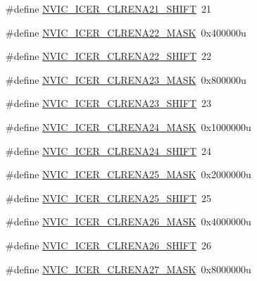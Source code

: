 \begin{DoxyCompactItemize}
\item 
\#define \hyperlink{group___n_v_i_c___register___masks_gaa517bbb381d2d5496341099c0bb969f1}{N\+V\+I\+C\+\_\+\+I\+C\+E\+R\+\_\+\+C\+L\+R\+E\+N\+A21\+\_\+\+S\+H\+I\+FT}~21
\item 
\#define \hyperlink{group___n_v_i_c___register___masks_gab16a0c722d3f0faf59b0bba1716439b3}{N\+V\+I\+C\+\_\+\+I\+C\+E\+R\+\_\+\+C\+L\+R\+E\+N\+A22\+\_\+\+M\+A\+SK}~0x400000u
\item 
\#define \hyperlink{group___n_v_i_c___register___masks_ga76e6fc6d65c0ad29a5c9a55e94af68bb}{N\+V\+I\+C\+\_\+\+I\+C\+E\+R\+\_\+\+C\+L\+R\+E\+N\+A22\+\_\+\+S\+H\+I\+FT}~22
\item 
\#define \hyperlink{group___n_v_i_c___register___masks_ga60342c001b88e3e3cffa9c0698561397}{N\+V\+I\+C\+\_\+\+I\+C\+E\+R\+\_\+\+C\+L\+R\+E\+N\+A23\+\_\+\+M\+A\+SK}~0x800000u
\item 
\#define \hyperlink{group___n_v_i_c___register___masks_ga0e37b1fbb84da874a2895cf218ed35fa}{N\+V\+I\+C\+\_\+\+I\+C\+E\+R\+\_\+\+C\+L\+R\+E\+N\+A23\+\_\+\+S\+H\+I\+FT}~23
\item 
\#define \hyperlink{group___n_v_i_c___register___masks_ga93a21554ca104636395542f6fc6efd6d}{N\+V\+I\+C\+\_\+\+I\+C\+E\+R\+\_\+\+C\+L\+R\+E\+N\+A24\+\_\+\+M\+A\+SK}~0x1000000u
\item 
\#define \hyperlink{group___n_v_i_c___register___masks_gad80450cb890f4b0e6d28710d1b148d52}{N\+V\+I\+C\+\_\+\+I\+C\+E\+R\+\_\+\+C\+L\+R\+E\+N\+A24\+\_\+\+S\+H\+I\+FT}~24
\item 
\#define \hyperlink{group___n_v_i_c___register___masks_ga073578acff1977037e578c80246d65fc}{N\+V\+I\+C\+\_\+\+I\+C\+E\+R\+\_\+\+C\+L\+R\+E\+N\+A25\+\_\+\+M\+A\+SK}~0x2000000u
\item 
\#define \hyperlink{group___n_v_i_c___register___masks_gae7ee3429daac3acad2fb4243991a2a57}{N\+V\+I\+C\+\_\+\+I\+C\+E\+R\+\_\+\+C\+L\+R\+E\+N\+A25\+\_\+\+S\+H\+I\+FT}~25
\item 
\#define \hyperlink{group___n_v_i_c___register___masks_gafdbc83b793a8dd6fc36eb373420aebd0}{N\+V\+I\+C\+\_\+\+I\+C\+E\+R\+\_\+\+C\+L\+R\+E\+N\+A26\+\_\+\+M\+A\+SK}~0x4000000u
\item 
\#define \hyperlink{group___n_v_i_c___register___masks_ga881a2bb46981a4b1417da75dc138cc3c}{N\+V\+I\+C\+\_\+\+I\+C\+E\+R\+\_\+\+C\+L\+R\+E\+N\+A26\+\_\+\+S\+H\+I\+FT}~26
\item 
\#define \hyperlink{group___n_v_i_c___register___masks_ga7d5a8587d423b64c21161e7a35bb4acc}{N\+V\+I\+C\+\_\+\+I\+C\+E\+R\+\_\+\+C\+L\+R\+E\+N\+A27\+\_\+\+M\+A\+SK}~0x8000000u

\end{DoxyCompactItemize}
